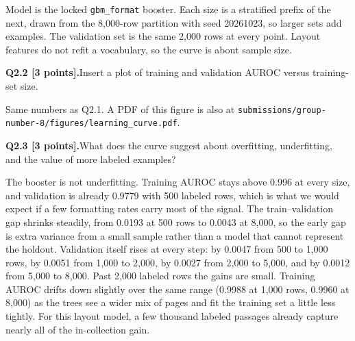\documentclass[11pt,letterpaper]{article}
\newcommand{\question}[2]{\needspace{4\baselineskip}\par\addvspace{0.45em}\noindent\textbf{#1}\quad #2\par\nobreak\vspace{0.1em}}
\newcommand{\smallnote}[1]{{\small\color{muted}#1}}
\begin{document}
\smallnote{Model is the locked \texttt{gbm\_format} booster. Each size is a stratified prefix of the next, drawn from the 8{,}000-row partition with seed 20261023, so larger sets add examples. The validation set is the same 2{,}000 rows at every point. Layout features do not refit a vocabulary, so the curve is about sample size.}

\question{Q2.2 [3 points].}{Insert a plot of training and validation AUROC versus training-set size.}

\begin{center}
\end{center}

\smallnote{Same numbers as Q2.1. A PDF of this figure is also at \texttt{submissions/group-number-8/figures/learning\_curve.pdf}.}

\question{Q2.3 [3 points].}{What does the curve suggest about overfitting, underfitting, and the value of more labeled examples?}

The booster is not underfitting. Training AUROC stays above 0.996 at every size, and validation is already 0.9779 with 500 labeled rows, which is what we would expect if a few formatting rates carry most of the signal. The train--validation gap shrinks steadily, from 0.0193 at 500 rows to 0.0043 at 8{,}000, so the early gap is extra variance from a small sample rather than a model that cannot represent the holdout. Validation itself rises at every step: by 0.0047 from 500 to 1{,}000 rows, by 0.0051 from 1{,}000 to 2{,}000, by 0.0027 from 2{,}000 to 5{,}000, and by 0.0012 from 5{,}000 to 8{,}000. Past 2{,}000 labeled rows the gains are small. Training AUROC drifts down slightly over the same range (0.9988 at 1{,}000 rows, 0.9960 at 8{,}000) as the trees see a wider mix of pages and fit the training set a little less tightly. For this layout model, a few thousand labeled passages already capture nearly all of the in-collection gain.
\end{document}
